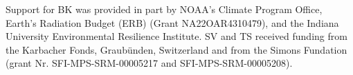 \documentclass[acp, manuscript]{copernicus}
\begin{document}






\begin{acknowledgements}
Support for BK was provided in part by NOAA's Climate Program Office, Earth’s Radiation Budget (ERB) (Grant NA22OAR4310479), and the Indiana University Environmental Resilience Institute. SV and TS received funding from the Karbacher Fonds, Graub\"unden, Switzerland and from the Simons Fundation (grant Nr. SFI-MPS-SRM-00005217 and SFI-MPS-SRM-00005208).
\end{acknowledgements}















\end{document}
